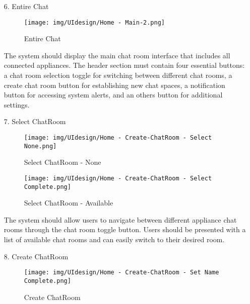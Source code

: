 \documentclass[conference]{IEEEtran}
\begin{document}
\begin{enumerate}
\begin{itemize}
\begin{itemize}
\begin{enumerate}
\begin{enumerate}
    \item[6.] Entire Chat
    \begin{figure}[h]
        {\centering
        \hspace{4cm}
        \begin{minipage}{0.4\columnwidth}
            \texttt{[image: img/UIdesign/Home - Main-2.png]}
            \caption{Entire Chat}
        \end{minipage}}
    \end{figure}    
    The system should display the main chat room interface that includes all connected appliances. The header section must contain four essential buttons: a chat room selection toggle for switching between different chat rooms, a create chat room button for establishing new chat spaces, a notification button for accessing system alerts, and an others button for additional settings. \\
\end{enumerate}

\begin{enumerate}
    \item[7.] Select ChatRoom
    \begin{figure}[h]
        \centering
        \begin{minipage}{0.4\columnwidth}
            \texttt{[image: img/UIdesign/Home - Create-ChatRoom - Select None.png]}
            \caption{Select ChatRoom - None}
        \end{minipage}
        \hfill
        \begin{minipage}{0.4\columnwidth}
            \texttt{[image: img/UIdesign/Home - Create-ChatRoom - Select Complete.png]}
            \caption{Select ChatRoom - Available}
        \end{minipage}
    \end{figure}
    
    The system should allow users to navigate between different appliance chat rooms through the chat room toggle button. Users should be presented with a list of available chat rooms and can easily switch to their desired room. \\
\end{enumerate}

\begin{enumerate}
    \item[8.] Create ChatRoom
    \begin{figure}[h]
        {\centering
        \hspace{4cm}
        \begin{minipage}{0.4\columnwidth}
            \texttt{[image: img/UIdesign/Home - Create-ChatRoom - Set Name Complete.png]}
            \caption{Create ChatRoom}
        \end{minipage}}
    \end{figure}
    

\end{enumerate}
\end{enumerate}
\end{itemize}
\end{itemize}
\end{enumerate}
\end{document}
